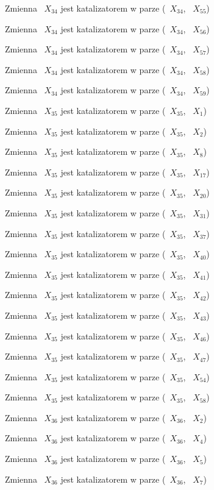 \documentclass{article}
\begin{document}
Zmienna ~$X_{34}$ jest katalizatorem w parze (~$X_{34}$, ~$X_{55}$)

Zmienna ~$X_{34}$ jest katalizatorem w parze (~$X_{34}$, ~$X_{56}$)

Zmienna ~$X_{34}$ jest katalizatorem w parze (~$X_{34}$, ~$X_{57}$)

Zmienna ~$X_{34}$ jest katalizatorem w parze (~$X_{34}$, ~$X_{58}$)

Zmienna ~$X_{34}$ jest katalizatorem w parze (~$X_{34}$, ~$X_{59}$)

Zmienna ~$X_{35}$ jest katalizatorem w parze (~$X_{35}$, ~$X_{1}$)

Zmienna ~$X_{35}$ jest katalizatorem w parze (~$X_{35}$, ~$X_{2}$)

Zmienna ~$X_{35}$ jest katalizatorem w parze (~$X_{35}$, ~$X_{8}$)

Zmienna ~$X_{35}$ jest katalizatorem w parze (~$X_{35}$, ~$X_{17}$)

Zmienna ~$X_{35}$ jest katalizatorem w parze (~$X_{35}$, ~$X_{20}$)

Zmienna ~$X_{35}$ jest katalizatorem w parze (~$X_{35}$, ~$X_{31}$)

Zmienna ~$X_{35}$ jest katalizatorem w parze (~$X_{35}$, ~$X_{37}$)

Zmienna ~$X_{35}$ jest katalizatorem w parze (~$X_{35}$, ~$X_{40}$)

Zmienna ~$X_{35}$ jest katalizatorem w parze (~$X_{35}$, ~$X_{41}$)

Zmienna ~$X_{35}$ jest katalizatorem w parze (~$X_{35}$, ~$X_{42}$)

Zmienna ~$X_{35}$ jest katalizatorem w parze (~$X_{35}$, ~$X_{43}$)

Zmienna ~$X_{35}$ jest katalizatorem w parze (~$X_{35}$, ~$X_{46}$)

Zmienna ~$X_{35}$ jest katalizatorem w parze (~$X_{35}$, ~$X_{47}$)

Zmienna ~$X_{35}$ jest katalizatorem w parze (~$X_{35}$, ~$X_{54}$)

Zmienna ~$X_{35}$ jest katalizatorem w parze (~$X_{35}$, ~$X_{58}$)

Zmienna ~$X_{36}$ jest katalizatorem w parze (~$X_{36}$, ~$X_{2}$)

Zmienna ~$X_{36}$ jest katalizatorem w parze (~$X_{36}$, ~$X_{4}$)

Zmienna ~$X_{36}$ jest katalizatorem w parze (~$X_{36}$, ~$X_{5}$)

Zmienna ~$X_{36}$ jest katalizatorem w parze (~$X_{36}$, ~$X_{7}$)
\end{document}
